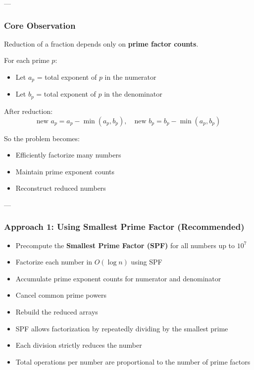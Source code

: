 \documentclass[11pt]{article}
\begin{document}
---

\subsubsection{Core Observation}

Reduction of a fraction depends only on \textbf{prime factor counts}.

For each prime $p$:
\begin{itemize}
    \item Let $a_p$ = total exponent of $p$ in the numerator
    \item Let $b_p$ = total exponent of $p$ in the denominator
\end{itemize}

After reduction:
\[
\text{new } a_p = a_p - \min(a_p, b_p),
\quad
\text{new } b_p = b_p - \min(a_p, b_p)
\]

So the problem becomes:
\begin{itemize}
    \item Efficiently factorize many numbers
    \item Maintain prime exponent counts
    \item Reconstruct reduced numbers
\end{itemize}

---

\subsubsection{Approach 1: Using Smallest Prime Factor (Recommended)}


\begin{itemize}
    \item Precompute the \textbf{Smallest Prime Factor (SPF)} for all numbers up to $10^7$
    \item Factorize each number in $O(\log n)$ using SPF
    \item Accumulate prime exponent counts for numerator and denominator
    \item Cancel common prime powers
    \item Rebuild the reduced arrays
\end{itemize}


\begin{itemize}
    \item SPF allows factorization by repeatedly dividing by the smallest prime
    \item Each division strictly reduces the number
    \item Total operations per number are proportional to the number of prime factors
\end{itemize}
\end{document}
